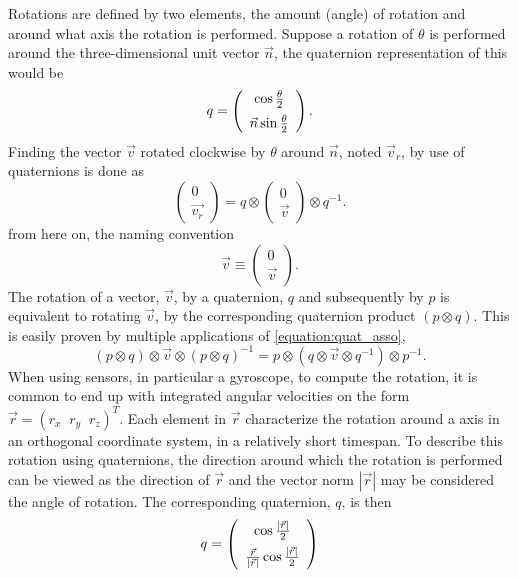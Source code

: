 \documentclass{LTHthesis}
\begin{document}
Rotations are defined by two elements, the amount (angle) of rotation and around what axis the rotation is performed. Suppose a rotation of $\theta$ is performed around the three-dimensional unit vector $\vec n$, the quaternion representation of this would be
\begin{equation}
q = \left(\begin{array}{c}\cos{\frac{\theta}{2}}\vspace{5pt}\\ \vec{n}\sin{\frac{\theta}{2}}\end{array}\right).
\end{equation}  
%
Finding the vector $\vec v$ rotated clockwise by $\theta$ around $\vec n$, noted $\vec v_r$, by use of quaternions is done as
%
\begin{equation}
\left(\begin{array}{c}0\\ \vec{v_r}\end{array}\right) = q\otimes \left(\begin{array}{c}0\\ \vec{v}\end{array}\right) \otimes q^{-1}.
\end{equation}
%
from here on, the naming convention
%
\begin{equation}
\vec v\equiv \left(\begin{array}{c}0\\ \vec{v}\end{array}\right).
\end{equation}
%
The rotation of a vector, $\vec v$, by a quaternion, $q$ and subsequently by $p$ is equivalent to rotating $\vec v$, by the corresponding quaternion product $(p\otimes q)$. This is easily proven by multiple applications of \ref{equation:quat_asso},
%
\begin{equation}
(p\otimes q)\otimes \vec v \otimes (p\otimes q)^{-1}=p\otimes(q\otimes\vec v\otimes q^{-1})\otimes p^{-1}. 
\end{equation}
%
When using sensors, in particular a gyroscope, to compute the rotation, it is common to end up with integrated angular velocities on the form $\vec{r} = (r_x \; \; r_y \; \; r_z)^T$. Each element in $\vec r$ characterize the rotation around a axis in an orthogonal coordinate system, in a relatively short timespan. To describe this rotation using quaternions, the direction around which the rotation is performed can be viewed as the direction of $\vec r$ and the vector norm $|\vec r|$ may be considered the angle of rotation. The corresponding quaternion, $q$, is then
%
\begin{equation}
q = \left(\begin{array}{c}\cos{\frac{|\vec r|}{2}}\vspace{5pt} \\ \frac{\vec{r}}{|\vec r|}\cos{\frac{|\vec r|}{2}}\end{array}\right)
\end{equation}
%
\end{document}
